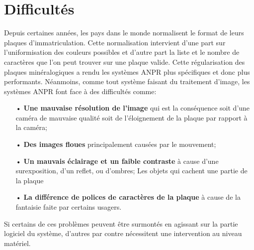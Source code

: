 \section{Difficultés}
Depuis certaines années, les pays dans le monde normalisent le format de leurs plaques d’immatriculation. Cette normalisation intervient d’une part sur l’uniformisation des couleurs possibles et d’autre part la liste et le nombre de caractères que l’on peut trouver sur une plaque valide. Cette régularisation des plaques minéralogiques a rendu les systèmes ANPR plus spécifiques et donc plus performants. Néanmoins, comme tout système faisant du traitement d’image, les systèmes ANPR font face à des difficultés comme:
    \begin{itemize}
        \item[•] \textbf{Une mauvaise résolution de l’image} qui est la conséquence soit d’une caméra de mauvaise qualité soit de l’éloignement de la plaque par rapport à la caméra;
        \item[•] \textbf{Des images floues} principalement causées par le mouvement;
        \item[•] \textbf{Un mauvais éclairage et un faible contraste } à cause d'une surexposition, d'un reflet, ou d'ombres;
        Les objets qui cachent une partie de la plaque
        \item[•] \textbf{La différence de polices de caractères de la plaque} à cause de la fantaisie faite par certains usagers. \cite{wikianpr}   
    \end{itemize}
Si certains de ces problèmes peuvent être surmontés en agissant sur la partie logiciel du système, d’autres par contre nécessitent une intervention au niveau matériel. 
